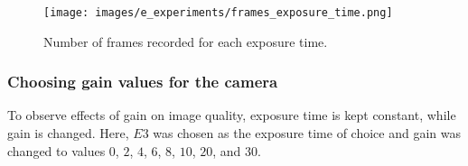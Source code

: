         \begin{figure}[ht]
            \centering
            \texttt{[image: images/e\_experiments/frames\_exposure\_time.png]}
            \caption{Number of frames recorded for each exposure time.}
            \label{fig:frames_exposure_time.png}
        \end{figure}
        


    \subsubsection*{Choosing gain values for the camera}
        To observe effects of gain on image quality, exposure time is kept constant, while gain is changed. Here, $E3$ was chosen as the exposure time of choice and gain was changed to values $0$, $2$, $4$, $6$, $8$, $10$, $20$, and $30$.

